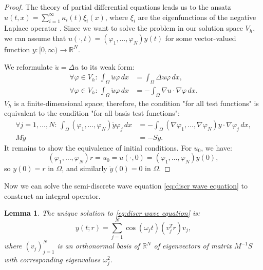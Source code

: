 \documentclass[a4paper,11pt,bibliography=totoc,listof=totoc,headinclude=true,cleardoublepage=empty,oneside]{scrbook}
\newtheorem{lemma}[theorem]{Lemma}
\newcommand{\R}{\mathbb{R}}
\begin{document}
\begin{proof}
    The theory of partial differential equations leads us to the ansatz $u(t, x) = \sum_{i=1}^\infty \kappa_i(t) \xi_i(x)$, where $\xi_i$ are the eigenfunctions of the negative Laplace operator \cite[p. 122]{Jungel}. Since we want to solve the problem in our solution space $V_h$, we can assume that $u(\cdot, t)=(\varphi_1, \dots, \varphi_N)y(t)$ for some vector-valued function $y: [0, \infty) \rightarrow \R^N$.

    We reformulate $\ddot{u} = \Delta u$ to its weak form:
    \begin{align*}
        \forall \varphi \in V_h : \, \int_\Omega \ddot{u} \varphi \, dx &= \int_\Omega \Delta u \varphi \, dx, \\
        \forall \varphi \in V_h : \, \int_\Omega \ddot{u} \varphi \, dx &= - \int_\Omega \nabla  u\cdot  \nabla \varphi \, dx.
    \end{align*}
    $V_h$ is a finite-dimensional space; therefore, the condition "for all test functions" is equivalent to the condition "for all basis test functions":
    \begin{align*}
        \forall j=1, \dots, N:\, \int_\Omega (\varphi_1, \dots, \varphi_N)\ddot{y} \varphi_j \, dx &= -  \int_\Omega (\nabla \varphi_1, \dots, \nabla \varphi_N)y\cdot  \nabla \varphi_j \, dx, \\
        M\ddot{y} &= -Sy.
    \end{align*}
    It remains to show the equivalence of initial conditions. For $u_0$, we have:
    \begin{equation*}
        (\varphi_1, \dots, \varphi_N)r = u_0 = u(\cdot, 0) = (\varphi_1, \dots, \varphi_N)y(0),
    \end{equation*}
    so $y(0) = r$ in $\Omega$, and similarly $\dot{y}(0) = 0$ in $\Omega$.
\end{proof}
Now we can solve the semi-discrete wave equation \eqref{eq:discr wave equation} to construct an integral operator. 
\begin{lemma}\label{lemma:y solution}
    The unique solution to \eqref{eq:discr wave equation} is:
    \begin{equation}\label{eq:solution wave eq}
        y(t; r) = \sum_{j=1}^N \cos(\omega_j t) (v_j^T r) v_j,
    \end{equation}
    where $(v_j)_{j=1}^N$ is an orthonormal basis of $\R^N$ of eigenvectors of matrix $M^{-1}S$ with corresponding eigenvalues $\omega_j^2$.
\end{lemma}
\end{document}
